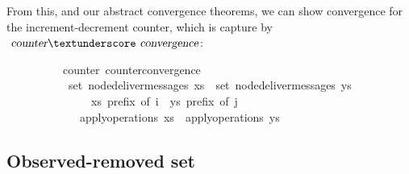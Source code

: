 \vspace{0.375em}
From this, and our abstract convergence theorems, we can show convergence for the increment-decrement counter, which is capture by $\isa{counter}{\isacharunderscore}\isa{convergence}$:
\vspace{0.375em}
\begin{isabellebody}
\ \ \ \ \ \ \ \ \ {\isacharparenleft}\ counter{\isacharparenright}\ counter{\isacharunderscore}convergence{\isacharcolon}\isanewline
\ \ \ \ \ \ \ \ \ \ \ {\isachardoublequoteopen}set\ {\isacharparenleft}node{\isacharunderscore}deliver{\isacharunderscore}messages\ xs{\isacharparenright}\ {\isacharequal}\ set\ {\isacharparenleft}node{\isacharunderscore}deliver{\isacharunderscore}messages\ ys{\isacharparenright}{\isachardoublequoteclose}\isanewline
\ \ \ \ \ \ \ \ \ \ \ \ \ \ \ {\isachardoublequoteopen}xs\ prefix\ of\ i{\isachardoublequoteclose}\ \ {\isachardoublequoteopen}ys\ prefix\ of\ j{\isachardoublequoteclose}\isanewline
\ \ \ \ \ \ \ \ \ \ \ \ \ {\isachardoublequoteopen}apply{\isacharunderscore}operations\ xs\ {\isacharequal}\ apply{\isacharunderscore}operations\ ys{\isachardoublequoteclose}\isanewline
\end{isabellebody}

\subsection{Observed-removed set}
\label{subsect.observed-removed.set}